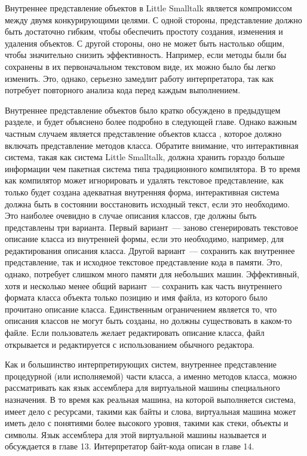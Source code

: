 
Внутреннее представление объектов в Little Smalltalk является компромиссом между
двумя конкурирующими целями. С одной стороны, представление должно быть
достаточно гибким, чтобы обеспечить простоту создания, изменения и удаления
объектов. С другой стороны, оно не может быть настолько общим, чтобы значительно
снизить эффективность. Например, если методы были бы сохранены в их
первоначальном текстовом виде, их можно было бы легко изменить. Это, однако,
серьезно замедлит работу интерпретатора, так как потребует повторного анализа
кода перед каждым выполнением.

Внутреннее представление объектов было кратко обсуждено в предыдущем разделе, и
будет объяснено более подробно в следующей главе. Однако важным частным случаем
является представление объектов класса , которое должно включать
представление методов класса. Обратите внимание, что интерактивная система,
такая как система Little Smalltalk, должна хранить гораздо больше информации чем
пакетная система типа традиционного компилятора. В то время как компилятор может
игнорировать и удалять текстовое представление, как только будет создана
адекватная внутренняя форма, интерактивная система должна быть в состоянии
восстановить исходный текст, если это необходимо. Это наиболее очевидно в случае
описания классов, где должны быть представлены три варианта. Первый вариант\ ---
заново сгенерировать текстовое описание класса из внутренней формы, если это
необходимо, например, для редактирования описания класса. Другой вариант\ ---
сохранить как внутреннее представление, так и исходное текстовое представление
кода в памяти. Это, однако, потребует слишком много памяти для небольших машин.
Эффективный, хотя и несколько менее общий вариант\ --- сохранить как часть
внутреннего формата класса объекта только позицию и имя файла, из которого было
прочитано описание класса. Единственным ограничением является то, что описания
классов не могут быть созданы, но должны существовать в каком-то файле. Если
пользователь желает редактировать описание класса, файл открывается и
редактируется с использованием обычного редактора.

Как и большинство интерпретирующих систем, внутреннее представление процедурной
(или исполняемой) части класса, а именно методов класса, можно рассматривать как
язык ассемблера для виртуальной машины специального назначения. В то время как
реальная машина, на которой выполняется система, имеет дело с ресурсами, такими
как байты и слова, виртуальная машина может иметь дело с понятиями более
высокого уровня, такими как стеки, объекты и символы. Язык ассемблера для этой
виртуальной машины называется  и обсуждается в главе 13.
Интерпретатор байт-кода описан в главе 14.
